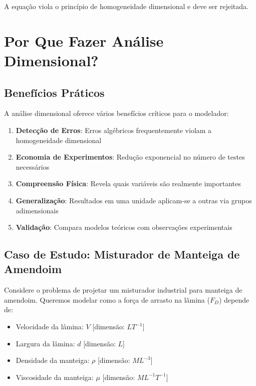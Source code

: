 \documentclass[12pt,a4paper,oneside]{book}
\theoremstyle{definition}
\begin{document}
A equação viola o princípio de homogeneidade dimensional e deve ser rejeitada.

\section{Por Que Fazer Análise Dimensional?}

\subsection{Benefícios Práticos}

A análise dimensional oferece vários benefícios críticos para o modelador:

\begin{enumerate}
    \item \textbf{Detecção de Erros}: Erros algébricos frequentemente violam a homogeneidade dimensional
    \item \textbf{Economia de Experimentos}: Redução exponencial no número de testes necessários
    \item \textbf{Compreensão Física}: Revela quais variáveis são realmente importantes
    \item \textbf{Generalização}: Resultados em uma unidade aplicam-se a outras via grupos adimensionais
    \item \textbf{Validação}: Compara modelos teóricos com observações experimentais
\end{enumerate}

\subsection{Caso de Estudo: Misturador de Manteiga de Amendoim}

Considere o problema de projetar um misturador industrial para manteiga de amendoim. Queremos modelar como a força de arrasto na lâmina ($F_D$) depende de:

\begin{itemize}
    \item Velocidade da lâmina: $V$ [dimensão: $LT^{-1}$]
    \item Largura da lâmina: $d$ [dimensão: $L$]
    \item Densidade da manteiga: $\rho$ [dimensão: $ML^{-3}$]
    \item Viscosidade da manteiga: $\mu$ [dimensão: $ML^{-1}T^{-1}$]
\end{itemize}
\end{document}
